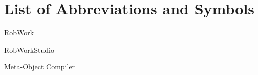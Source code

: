 \fancyfoot[LE,RO]{\thepage}
\section*{List of Abbreviations and Symbols}

\begin{description}[leftmargin=!,labelwidth=\widthof{\bfseries LONG}]
\item [RW] RobWork
\item [RWS]RobWorkStudio
\item [moc]Meta-Object Compiler
\end{description}



\clearpage
